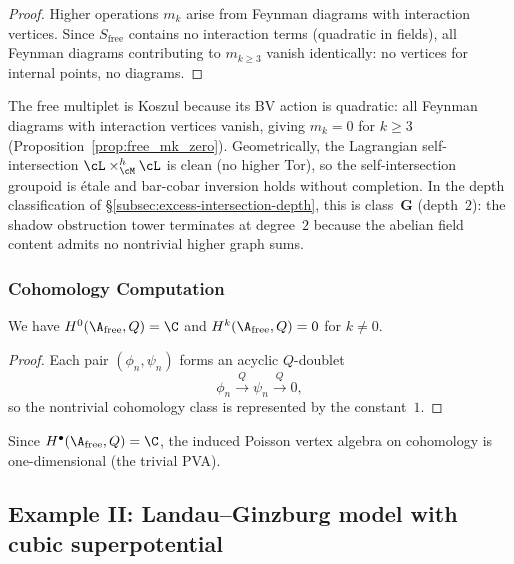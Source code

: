 \begin{proof}
Higher operations $m_k$ arise from Feynman diagrams with interaction vertices. Since $S_{\text{free}}$ contains no interaction terms (quadratic in fields), all Feynman diagrams contributing to $m_{k \geq 3}$ vanish identically: no vertices for internal points, no diagrams.
\end{proof}

\begin{remark}
\label{rem:free-koszul-clean}
The free multiplet is Koszul because its BV action is
quadratic: all Feynman diagrams with interaction vertices
vanish, giving $m_k = 0$ for $k \ge 3$
(Proposition~\ref{prop:free_mk_zero}). Geometrically, the
Lagrangian self-intersection
$\cL \times_{\cM}^h \cL$ is clean (no higher Tor), so the
self-intersection groupoid is \'etale and bar-cobar inversion
holds without completion.
In the depth classification of
\S\ref{subsec:excess-intersection-depth}, this is
class~$\mathbf{G}$ (depth~$2$): the shadow obstruction tower terminates
at degree~$2$ because the abelian field content admits no
nontrivial higher graph sums.
\end{remark}

\subsubsection{Cohomology Computation}

\begin{proposition}
\label{prop:free_cohomology}
We have $H^0(\A_{\text{free}}, Q) = \C$ and $H^k(\A_{\text{free}}, Q) = 0$ for $k \neq 0$.
\end{proposition}

\begin{proof}
Each pair $(\phi_n,\psi_n)$ forms an acyclic $Q$-doublet
\[
\phi_n \xrightarrow{Q} \psi_n \xrightarrow{Q} 0,
\]
so the nontrivial cohomology class is represented by the constant~$1$.
\end{proof}

\begin{remark}
Since $H^\bullet(\A_{\text{free}}, Q) = \C$, the induced Poisson vertex algebra on cohomology is one-dimensional (the trivial PVA).
\end{remark}

\subsection{Example II: Landau--Ginzburg model with cubic superpotential}
\label{rem:LG}

